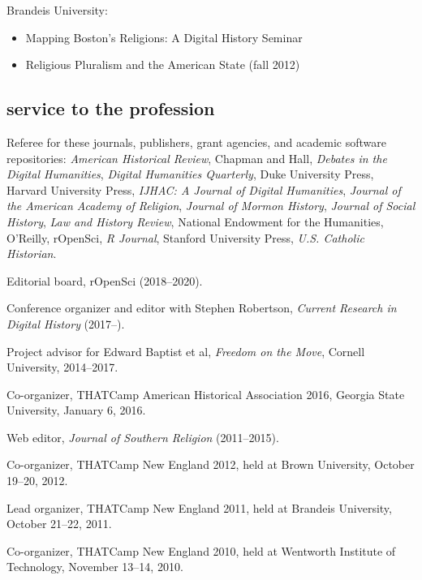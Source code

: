 \documentclass[11pt]{article}
\providecommand{\tightlist}{%
  \setlength{\itemsep}{0pt}\setlength{\parskip}{0pt}}
\begin{document}
\vspace{-0.1in}

Brandeis University:

\vspace{-0.15in}

\begin{itemize}
    \tightlist
  \item
    Mapping Boston's Religions: A Digital History Seminar 
  \item
    Religious Pluralism and the American State (fall 2012)
\end{itemize}

\subsection{service to the profession}\label{service-profession}

Referee for these journals, publishers, grant agencies, and academic software 
repositories: \emph{American Historical Review}, Chapman and Hall, 
\emph{Debates in the Digital Humanities}, \emph{Digital Humanities Quarterly}, 
Duke University Press, Harvard University Press, \emph{IJHAC: A Journal of 
  Digital Humanities}, \emph{Journal of the American Academy of Religion}, 
\emph{Journal of Mormon History}, \emph{Journal of Social History}, \emph{Law 
  and History Review}, National Endowment for the Humanities, O'Reilly, 
rOpenSci, \emph{R Journal}, Stanford University Press, \emph{U.S. Catholic
Historian}.

Editorial board, rOpenSci (2018--2020).

Conference organizer and editor with Stephen Robertson, \emph{Current Research 
  in Digital History} (2017--).

Project advisor for Edward Baptist et al, \emph{Freedom on the Move}, Cornell 
University, 2014--2017.

Co-organizer, THATCamp American Historical Association 2016, Georgia State University, January 6, 2016.

Web editor, \emph{Journal of Southern Religion} (2011--2015).

Co-organizer, THATCamp New England 2012, held at Brown University,
October 19--20, 2012.

Lead organizer, THATCamp New England 2011, held at Brandeis University,
October 21--22, 2011.

Co-organizer, THATCamp New England 2010, held at Wentworth Institute of
Technology, November 13--14, 2010.
\end{document}
